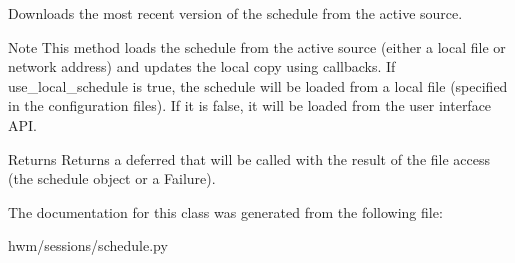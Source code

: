Downloads the most recent version of the schedule from the active source. 

\begin{DoxyNote}{Note}
This method loads the schedule from the active source (either a local file or network address) and updates the local copy using callbacks. If use\-\_\-local\-\_\-schedule is true, the schedule will be loaded from a local file (specified in the configuration files). If it is false, it will be loaded from the user interface A\-P\-I.
\end{DoxyNote}
\begin{DoxyReturn}{Returns}
Returns a deferred that will be called with the result of the file access (the schedule object or a Failure). 
\end{DoxyReturn}


The documentation for this class was generated from the following file\-:\begin{DoxyCompactItemize}
\item 
hwm/sessions/schedule.\-py\end{DoxyCompactItemize}
